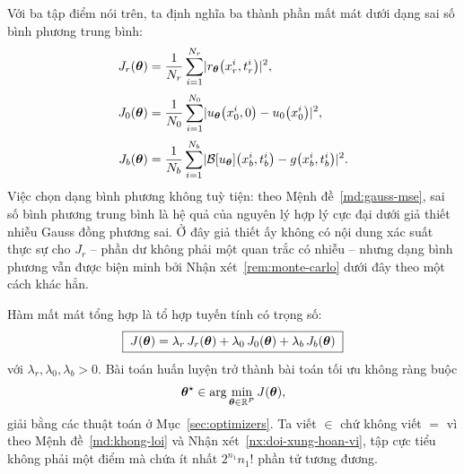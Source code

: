 Với ba tập điểm nói trên, ta định nghĩa ba thành phần mất mát dưới dạng sai số
bình phương trung bình:
\begin{align}
J_{r}(\bm{\theta})
  &= \frac{1}{N_{r}} \sum_{i=1}^{N_{r}}
     \lvert r_{\bm{\theta}}\!\left(x_{r}^{i}, t_{r}^{i}\right)\rvert^{2},
     \label{eq:loss-r}\\[2pt]
J_{0}(\bm{\theta})
  &= \frac{1}{N_{0}} \sum_{i=1}^{N_{0}}
     \lvert u_{\bm{\theta}}\!\left(x_{0}^{i}, 0\right)
          - u_{0}\!\left(x_{0}^{i}\right)\rvert^{2},
     \label{eq:loss-0}\\[2pt]
J_{b}(\bm{\theta})
  &= \frac{1}{N_{b}} \sum_{i=1}^{N_{b}}
     \lvert\mathcal{B}\!\left[u_{\bm{\theta}}\right]\!\left(x_{b}^{i}, t_{b}^{i}\right)
          - g\!\left(x_{b}^{i}, t_{b}^{i}\right)\rvert^{2}.
     \label{eq:loss-b}
\end{align}
Việc chọn dạng bình phương không tuỳ tiện: theo
Mệnh đề~\ref{md:gauss-mse}, sai số bình phương trung bình là hệ quả của nguyên lý
hợp lý cực đại dưới giả thiết nhiễu Gauss đồng phương sai. Ở đây giả thiết ấy
không có nội dung xác suất thực sự cho $J_r$ -- phần dư không phải một quan trắc
có nhiễu -- nhưng dạng bình phương vẫn được biện minh bởi
Nhận xét~\ref{rem:monte-carlo} dưới đây theo một cách khác hẳn.
 
Hàm mất mát tổng hợp là tổ hợp tuyến tính có trọng số:
\begin{equation}
\boxed{\;
J(\bm{\theta})
= \lambda_{r}\, J_{r}(\bm{\theta})
+ \lambda_{0}\, J_{0}(\bm{\theta})
+ \lambda_{b}\, J_{b}(\bm{\theta})
\;}
\label{eq:total-loss}
\end{equation}
với $\lambda_{r}, \lambda_{0}, \lambda_{b} > 0$. Bài toán huấn luyện trở thành bài
toán tối ưu không ràng buộc
\begin{equation}
\bm{\theta}^{\star} \in \arg\min_{\bm{\theta} \in \mathbb{R}^{P}} J(\bm{\theta}),
\label{eq:opt-problem}
\end{equation}
giải bằng các thuật toán ở Mục~\ref{sec:optimizers}. Ta viết $\in$ chứ không viết
$=$ vì theo Mệnh đề~\ref{md:khong-loi} và Nhận xét~\ref{nx:doi-xung-hoan-vi}, tập
cực tiểu không phải một điểm mà chứa ít nhất $2^{n_1}n_1!$ phần tử tương đương.
 
